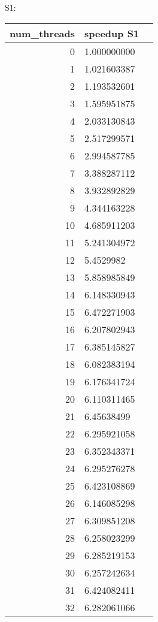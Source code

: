 \documentclass[a4paper,12pt]{scrartcl}
\begin{document}
S1:\\
\begin{tabular}{|r|l|l|}
num\_threads & speedup S1 \\  \hline 
0  & 1.000000000  \\ \hline 
1  & 1.021603387  \\ \hline 
2  & 1.193532601  \\ \hline
3  & 1.595951875  \\ \hline
4  & 2.033130843  \\ \hline
5  & 2.517299571  \\ \hline
6  & 2.994587785  \\ \hline
7  & 3.388287112  \\ \hline
8  & 3.932892829 \\ \hline
9  & 4.344163228  \\ \hline
10 & 4.685911203  \\ \hline
11 & 5.241304972  \\ \hline
12 & 5.4529982    \\ \hline
13 & 5.858985849  \\ \hline
14 & 6.148330943  \\ \hline
15 & 6.472271903  \\ \hline
16 & 6.207802943 \\ \hline
17 & 6.385145827  \\ \hline
18 & 6.082383194  \\ \hline
19 & 6.176341724 \\ \hline
20 & 6.110311465  \\ \hline
21 & 6.45638499   \\ \hline
22 & 6.295921058  \\ \hline
23 & 6.352343371  \\ \hline
24 & 6.295276278  \\ \hline
25 & 6.423108869  \\ \hline
26 & 6.146085298  \\ \hline
27 & 6.309851208  \\ \hline
28 & 6.258023299  \\ \hline
29 & 6.285219153  \\ \hline
30 & 6.257242634  \\ \hline
31 & 6.424082411  \\ \hline
32 & 6.282061066  \\ \hline
\end{tabular} 
\end{document}
